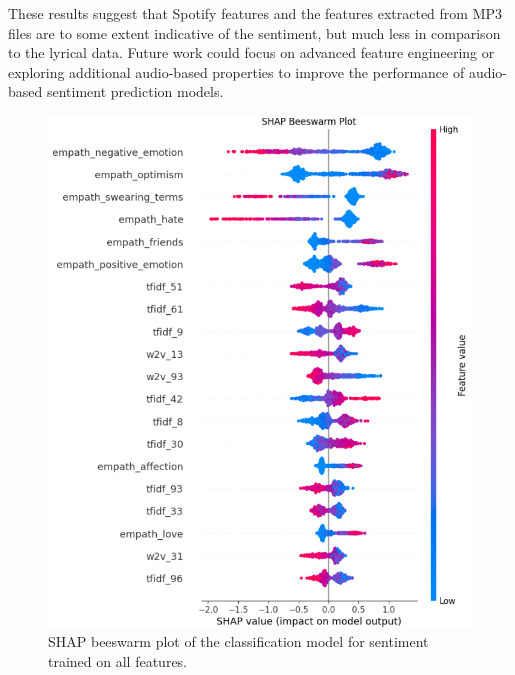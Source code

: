 These results suggest that Spotify features and the features extracted from MP3
files are to some extent indicative of the sentiment, but much less in
comparison to the lyrical data. Future work could focus on advanced feature
engineering or exploring additional audio-based properties to improve the
performance of audio-based sentiment prediction models.


\begin{center}
\begin{figure}[H]
  \centering
  \includegraphics[width=6in]{img/beeswarm_sentiment.png}
  \caption{SHAP beeswarm plot of the classification model for sentiment
  trained on all features.}
  \label{Figure:beeswarm_sentiment}
\end{figure}
\end{center}


